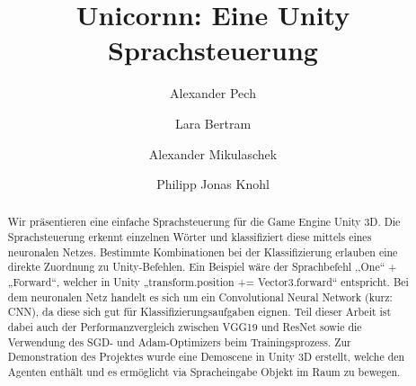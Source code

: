 \documentclass[sigconf]{acmart}
\begin{document}
\title{Unicornn: Eine Unity Sprachsteuerung}

\author{Alexander Pech}

\author{Lara Bertram}

\author{Alexander Mikulaschek}

\author{Philipp Jonas Knohl}

\begin{abstract}
Wir präsentieren eine einfache Sprachsteuerung für die Game Engine Unity 3D. Die Sprachsteuerung erkennt einzelnen Wörter und klassifiziert diese mittels eines neuronalen Netzes. Bestimmte Kombinationen bei der Klassifizierung erlauben eine direkte Zuordnung zu Unity-Befehlen.  
Ein Beispiel wäre der Sprachbefehl ,,One“ + „Forward“, welcher in Unity „transform.position += Vector3.forward“ entspricht.
\newline
\newline
Bei dem neuronalen Netz handelt es sich um ein Convolutional Neural Network (kurz: CNN), da diese sich gut für Klassifizierungsaufgaben eignen. Teil dieser Arbeit ist dabei auch der Performanzvergleich zwischen VGG19 \cite{simonyan2014deep} und ResNet \cite{he2015deep} sowie die Verwendung des SGD- und Adam-Optimizers beim Trainingsprozess. 
Zur Demonstration des Projektes wurde eine Demoscene in Unity 3D erstellt, welche den Agenten enthält und es ermöglicht via Spracheingabe Objekt im Raum zu bewegen. 
\end{abstract}

\end{document}
